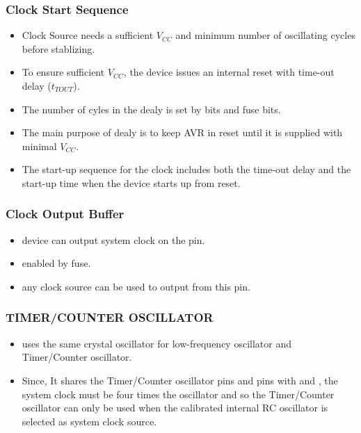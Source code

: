 \subsubsection*{Clock Start Sequence}
\begin{itemize}
    \item Clock Source needs a sufficient $V_{CC}$ and minimum number of oscillating cycles before stablizing.
    \item To ensure sufficient $V_{CC}$, the device issues an internal reset with time-out delay ($t_{TOUT}$).
    \item The number of cyles in the dealy is set by  bits and  fuse bits.
    \item The main purpose of dealy is to keep AVR in reset until it is supplied with minimal $V_{CC}$.
    \item The start-up sequence for the clock includes both the time-out delay and the start-up time when the device starts up from
    reset.
\end{itemize}

\subsubsection*{Clock Output Buffer}
\begin{itemize}
    \item device can output system clock on the  pin.
    \item enabled by  fuse.
    \item any clock source can be used to output from this pin.
\end{itemize}

\subsubsection*{TIMER/COUNTER OSCILLATOR}
\begin{itemize}
    \item uses the same crystal oscillator for low-frequency oscillator and Timer/Counter oscillator.
    \item Since, It shares the Timer/Counter oscillator pins   and  pins with  and , the system clock must be four times the oscillator and so the Timer/Counter oscillator can only be used when the calibrated internal RC oscillator is selected as system clock source.
\end{itemize}

